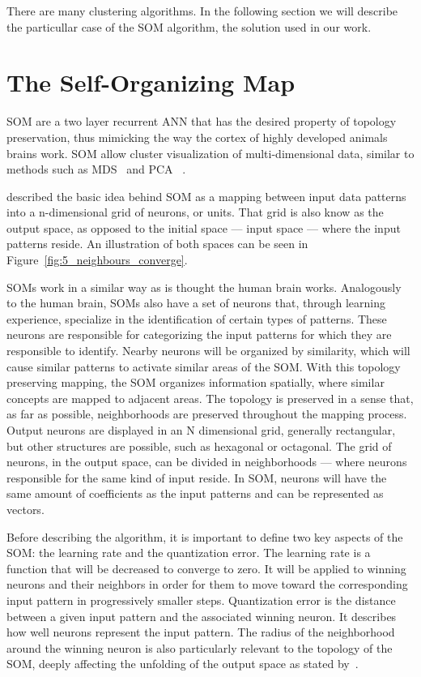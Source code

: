 There are many clustering algorithms. In the following section we will describe the particullar case of the \ac{SOM} algorithm, the solution used in our work.

\section{The Self-Organizing Map} 
\label{sec:the_self_organizing_map}

\ac{SOM} are a two layer recurrent \ac{ANN} that has the desired property of topology preservation, thus mimicking the way the cortex of highly developed animals brains work. \ac{SOM} allow cluster visualization of multi-dimensional data, similar to methods such as \ac{MDS}~\cite{KruskalWish1978} and \ac{PCA}~\cite{Hotelling_1933} .  

\citet{Bacao2005} described the basic idea behind \ac{SOM} as a mapping between input data patterns into a n-dimensional grid of neurons, or units. That grid is also know as the output space, as opposed to the initial space --- input space --- where the input patterns reside. An illustration of both spaces can be seen in Figure~\ref{fig:5_neighbours_converge}.

SOMs work in a similar way as is thought the human brain works. Analogously to the human brain, SOMs also have a set of neurons that, through learning experience, specialize in the identification of certain types of patterns. These neurons are responsible for categorizing the input patterns for which they are responsible to identify. Nearby neurons will be organized by similarity, which will cause similar patterns to activate similar areas of the \ac{SOM}.
With this topology preserving mapping, the \ac{SOM} organizes information spatially, where similar concepts are mapped to adjacent areas. The topology is preserved in a sense that, as far as possible, neighborhoods are preserved throughout the mapping process.
Output neurons are displayed in an N dimensional grid, generally rectangular, but other structures are possible, such as hexagonal or octagonal.  The grid of neurons, in the output space, can be divided in neighborhoods --- where neurons responsible for the same kind of input reside.
In \ac{SOM}, neurons will have the same amount of coefficients as the input patterns and can be represented as vectors.

Before describing the algorithm, it is important to define two key aspects of the \ac{SOM}: the learning rate and the quantization error. The learning rate is a function that will be decreased to converge to zero. It will be applied to winning neurons and their neighbors in order for them to move toward the corresponding input pattern in progressively smaller steps. Quantization error is the distance between a given input pattern and the associated winning neuron. It describes how well neurons represent the input pattern. The radius of the neighborhood around the winning neuron is also particularly relevant to the topology of the \ac{SOM}, deeply affecting the unfolding of the output space as stated by~\citet{Bacao2005}. 

